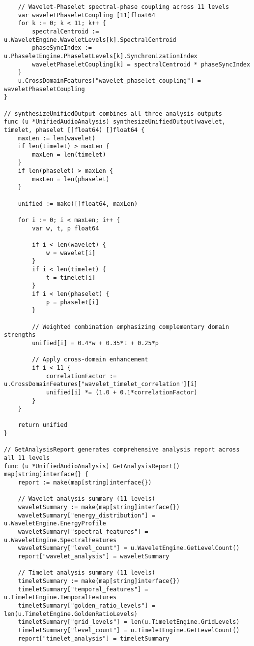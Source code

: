 \begin{tcolorbox}[colback=CodeBackground, colframe=DarkGray, title=Unified 11-Level Audio Analysis Framework, fonttitle=\bfseries]
\begin{verbatim}
    // Wavelet-Phaselet spectral-phase coupling across 11 levels
    var waveletPhaseletCoupling [11]float64
    for k := 0; k < 11; k++ {
        spectralCentroid := u.WaveletEngine.WaveletLevels[k].SpectralCentroid
        phaseSyncIndex := u.PhaseletEngine.PhaseletLevels[k].SynchronizationIndex
        waveletPhaseletCoupling[k] = spectralCentroid * phaseSyncIndex
    }
    u.CrossDomainFeatures["wavelet_phaselet_coupling"] = waveletPhaseletCoupling
}

// synthesizeUnifiedOutput combines all three analysis outputs
func (u *UnifiedAudioAnalysis) synthesizeUnifiedOutput(wavelet, timelet, phaselet []float64) []float64 {
    maxLen := len(wavelet)
    if len(timelet) > maxLen {
        maxLen = len(timelet)
    }
    if len(phaselet) > maxLen {
        maxLen = len(phaselet)
    }
    
    unified := make([]float64, maxLen)
    
    for i := 0; i < maxLen; i++ {
        var w, t, p float64
        
        if i < len(wavelet) {
            w = wavelet[i]
        }
        if i < len(timelet) {
            t = timelet[i]
        }
        if i < len(phaselet) {
            p = phaselet[i]
        }
        
        // Weighted combination emphasizing complementary domain strengths
        unified[i] = 0.4*w + 0.35*t + 0.25*p
        
        // Apply cross-domain enhancement
        if i < 11 {
            correlationFactor := u.CrossDomainFeatures["wavelet_timelet_correlation"][i]
            unified[i] *= (1.0 + 0.1*correlationFactor)
        }
    }
    
    return unified
}

// GetAnalysisReport generates comprehensive analysis report across all 11 levels
func (u *UnifiedAudioAnalysis) GetAnalysisReport() map[string]interface{} {
    report := make(map[string]interface{})
    
    // Wavelet analysis summary (11 levels)
    waveletSummary := make(map[string]interface{})
    waveletSummary["energy_distribution"] = u.WaveletEngine.EnergyProfile
    waveletSummary["spectral_features"] = u.WaveletEngine.SpectralFeatures
    waveletSummary["level_count"] = u.WaveletEngine.GetLevelCount()
    report["wavelet_analysis"] = waveletSummary
    
    // Timelet analysis summary (11 levels)
    timeletSummary := make(map[string]interface{})
    timeletSummary["temporal_features"] = u.TimeletEngine.TemporalFeatures
    timeletSummary["golden_ratio_levels"] = len(u.TimeletEngine.GoldenRatioLevels)
    timeletSummary["grid_levels"] = len(u.TimeletEngine.GridLevels)
    timeletSummary["level_count"] = u.TimeletEngine.GetLevelCount()
    report["timelet_analysis"] = timeletSummary
    

\end{verbatim}
\end{tcolorbox}
